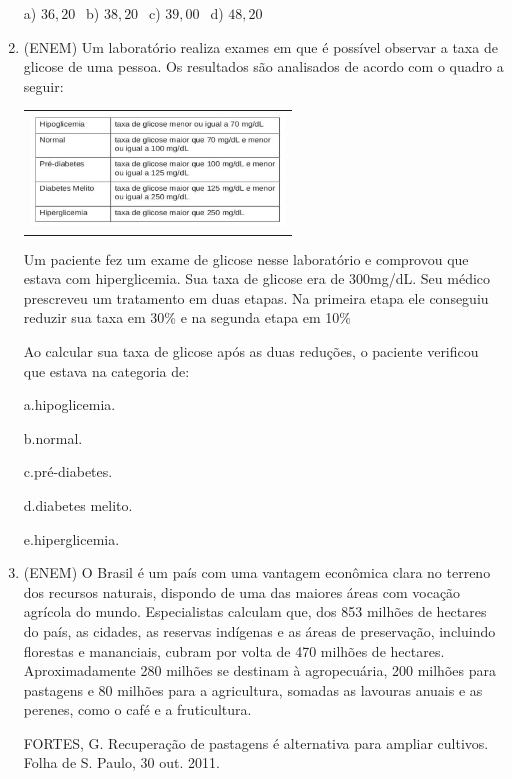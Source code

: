 \begin{multicols*}{2}
\begin{enumerate}
              a) $36,20 \ \ $ b) $38,20 \ \ $ c) $39,00 \ \ $ d) $48,20 $

        \item (ENEM) Um laboratório realiza exames em que é possível observar a taxa de glicose de uma pessoa. Os
              resultados são analisados de acordo com o quadro a seguir:

              \begin{tabular}{@{}c@{}}
                  \includegraphics[height=30mm]{assets/glicemia.png}
              \end{tabular}

              Um paciente fez um exame de glicose nesse laboratório e comprovou que estava com hiperglicemia. Sua taxa de
              glicose era de 300mg/dL. Seu médico prescreveu um tratamento em duas etapas. Na primeira etapa ele
              conseguiu reduzir sua taxa em 30\% e na segunda etapa em 10\%

              Ao calcular sua taxa de glicose após as duas reduções, o paciente verificou que estava na categoria de:

              a.hipoglicemia.

              b.normal.

              c.pré-diabetes.

              d.diabetes melito.

              e.hiperglicemia.


        \item (ENEM) O Brasil é um país com uma vantagem econômica clara no terreno dos recursos naturais, dispondo de uma das maiores áreas com vocação agrícola do mundo. Especialistas calculam que, dos 853 milhões de hectares do país, as cidades, as reservas indígenas e as áreas de preservação, incluindo florestas e mananciais, cubram por volta de 470 milhões de hectares. Aproximadamente 280 milhões se destinam à agropecuária, 200 milhões para pastagens e 80 milhões para a agricultura, somadas as lavouras anuais e as perenes, como o café e a fruticultura.

              FORTES, G. Recuperação de pastagens é alternativa para ampliar cultivos. Folha de S. Paulo, 30 out. 2011.


\end{enumerate}
\end{multicols*}
